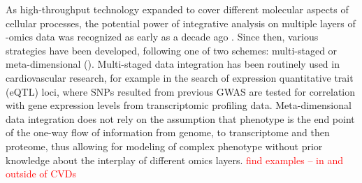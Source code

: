 \documentclass[letter]{bioinfo}
\newcommand{\comment}[1]{\textcolor{red}{#1}}
\begin{document}
	As high-throughput technology expanded to cover different molecular aspects of cellular processes, the potential power of integrative analysis on multiple layers of -omics data was recognized as early as a decade ago \citep{Hawkins:2010:Nextgeneration}. Since then, various strategies have been developed, following one of two schemes: multi-staged or meta-dimensional (\cite{Ritchie:2015:Methods}). Multi-staged data integration has been routinely used in cardiovascular research, for example in the search of expression quantitative trait (eQTL) loci, where SNPs resulted from previous GWAS are tested for correlation with gene expression levels from transcriptomic profiling data. Meta-dimensional data integration does not rely on the assumption that phenotype is the end point of the one-way flow of information from genome, to transcriptome and then proteome, thus allowing for modeling of complex phenotype without prior knowledge about the interplay of different omics layers.
	\comment{find examples -- in and outside of CVDs}
	

	
	

	
	
	
	
	


	
	
\end{document}
